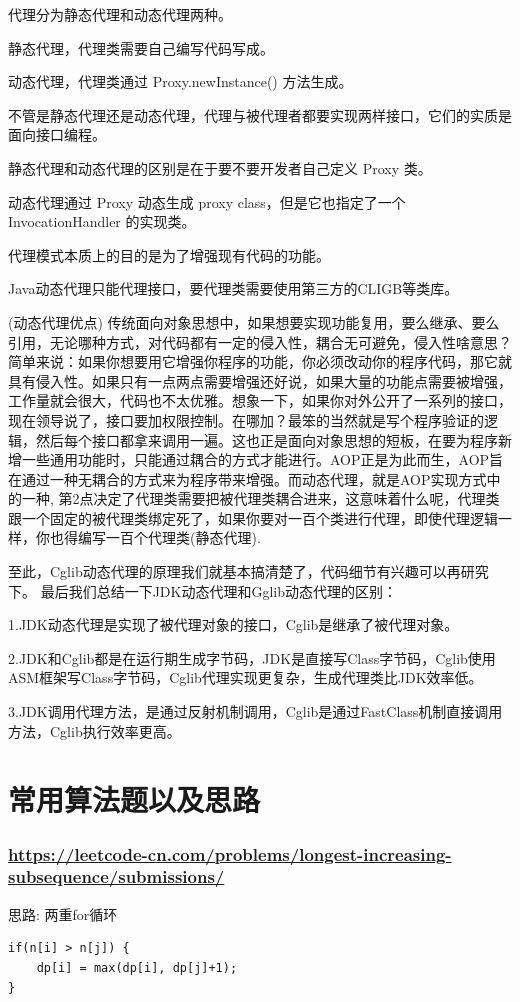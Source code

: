 \documentclass[UTF8]{ctexart}
\begin{document}
代理分为静态代理和动态代理两种。

静态代理，代理类需要自己编写代码写成。

动态代理，代理类通过 Proxy.newInstance() 方法生成。

不管是静态代理还是动态代理，代理与被代理者都要实现两样接口，它们的实质是面向接口编程。

静态代理和动态代理的区别是在于要不要开发者自己定义 Proxy 类。

动态代理通过 Proxy 动态生成 proxy class，但是它也指定了一个 InvocationHandler 的实现类。

代理模式本质上的目的是为了增强现有代码的功能。

Java动态代理只能代理接口，要代理类需要使用第三方的CLIGB等类库。

(动态代理优点)
传统面向对象思想中，如果想要实现功能复用，要么继承、要么引用，无论哪种方式，对代码都有一定的侵入性，耦合无可避免，侵入性啥意思？简单来说：如果你想要用它增强你程序的功能，你必须改动你的程序代码，那它就具有侵入性。如果只有一点两点需要增强还好说，如果大量的功能点需要被增强，工作量就会很大，代码也不太优雅。想象一下，如果你对外公开了一系列的接口，现在领导说了，接口要加权限控制。在哪加？最笨的当然就是写个程序验证的逻辑，然后每个接口都拿来调用一遍。这也正是面向对象思想的短板，在要为程序新增一些通用功能时，只能通过耦合的方式才能进行。AOP正是为此而生，AOP旨在通过一种无耦合的方式来为程序带来增强。而动态代理，就是AOP实现方式中的一种, 第2点决定了代理类需要把被代理类耦合进来，这意味着什么呢，代理类跟一个固定的被代理类绑定死了，如果你要对一百个类进行代理，即使代理逻辑一样，你也得编写一百个代理类(静态代理).


至此，Cglib动态代理的原理我们就基本搞清楚了，代码细节有兴趣可以再研究下。
最后我们总结一下JDK动态代理和Gglib动态代理的区别：

1.JDK动态代理是实现了被代理对象的接口，Cglib是继承了被代理对象。

2.JDK和Cglib都是在运行期生成字节码，JDK是直接写Class字节码，Cglib使用ASM框架写Class字节码，Cglib代理实现更复杂，生成代理类比JDK效率低。

3.JDK调用代理方法，是通过反射机制调用，Cglib是通过FastClass机制直接调用方法，Cglib执行效率更高。

\section{常用算法题以及思路}
\subsubsection{\url{https://leetcode-cn.com/problems/longest-increasing-subsequence/submissions/}}
思路: 两重for循环
\begin{lstlisting}
if(n[i] > n[j]) {
	dp[i] = max(dp[i], dp[j]+1);
}
\end{lstlisting}
\end{document}
